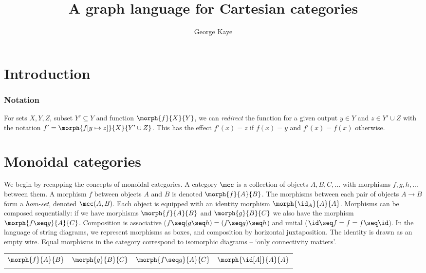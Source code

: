 \documentclass[10pt]{article}
\title{A graph language for Cartesian categories}
\author{George Kaye}
\begin{document}
\maketitle

\section{Introduction}

\subsubsection*{Notation}

For sets $X, Y, Z$, subset $Y' \subseteq Y$ and function $\morph{f}{X}{Y}$, we can \emph{redirect} the function for a given output $y \in Y$ and $z \in Y' \cup Z$ with the notation $f' = \morph{f[y \mapsto z]}{X}{Y' \cup Z}$.
This has the effect $f'(x) = z$ if $f(x) = y$ and $f'(x) = f(x)$ otherwise. 

\section{Monoidal categories}\label{sec:monoidal-categories}

\toggletrue{stringtypes}
\togglefalse{stringcaps}

We begin by recapping the concepts of monoidal categories.
A category $\mcc$ is a collection of objects $A,B,C,...$ with morphisms $f,g,h,...$ between them. 
A morphism $f$ between objects $A$ and $B$ is denoted $\morph{f}{A}{B}$. 
The morphisms between each pair of objects $A \to B$ form a \emph{hom-set}, denoted $\mcc(A,B)$. 
Each object is equipped with an identity morphism $\morph{\id_A}{A}{A}$. 
Morphisms can be composed sequentially: if we have morphisms $\morph{f}{A}{B}$ and $\morph{g}{B}{C}$ we also have the morphism $\morph{f \seq g}{A}{C}$. 
Composition is associative ($f \seq (g \seq h) = (f \seq g) \seq h$) and unital ($\id \seq f = f = f \seq \id$).
In the language of string diagrams, we represent morphisms as boxes, and composition by horizontal juxtaposition.
The identity is drawn as an empty wire.
Equal morphisms in the category correspond to isomorphic diagrams -- `only connectivity matters'.

\begin{floating}
    \begin{tabular}{cccc}
        \rule[-1em]{0pt}{0pt}$\morph{f}{A}{B}$ & $\morph{g}{B}{C}$ & $\morph{f \seq g}{A}{C}$ & $\morph{\id[A]}{A}{A}$ \\
         &
         &
         &
        \raisebox{0.4em}{}
    \end{tabular}
\end{floating}
\end{document}
